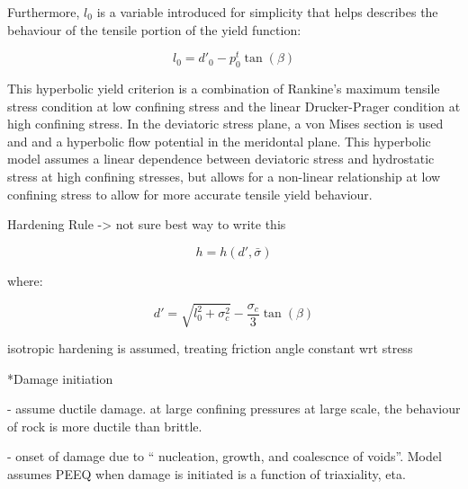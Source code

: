 Furthermore, $l_0$ is a variable introduced for simplicity that helps describes the behaviour of the tensile portion of the yield function: 

\begin{equation}
l_{0}=d'_{0}-p_{0}^{t}\tan\left(\beta\right)\label{eqn:druc2-1}
\end{equation}

This hyperbolic yield criterion is a combination of Rankine's maximum tensile stress condition at low confining stress and the linear Drucker-Prager condition at high confining stress. In the deviatoric stress plane, a von Mises section is used and and a hyperbolic flow potential in the meridontal plane. This hyperbolic model assumes a linear dependence between deviatoric stress and hydrostatic stress at high confining stresses, but allows for a non-linear relationship at low confining stress to allow for more accurate tensile yield behaviour.







Hardening Rule -> not sure best way to write this

\begin{equation}
h=h\left(d',\bar{\sigma}\right)\label{eqn:druc6}
\end{equation}


where:

\begin{equation}
d'=\sqrt{l_{0}^{2}+\sigma_{c}^{2}}-\frac{\sigma_{c}}{3}\tan\left(\beta\right)\label{eqn:druc6-1}
\end{equation}


isotropic hardening is assumed, treating friction angle constant wrt
stress

{*}Damage initiation

- assume ductile damage. at large confining pressures at large scale,
the behaviour of rock is more ductile than brittle.

- onset of damage due to `` nucleation, growth, and coalescnce of
voids''. Model assumes PEEQ when damage is initiated is a function
of triaxiality, eta.

